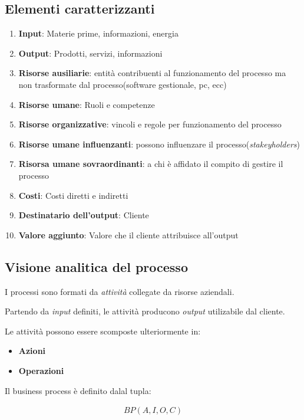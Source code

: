 \subsection{Elementi caratterizzanti}

\begin{enumerate}
  \item \textbf{Input}: Materie prime, informazioni, energia
  \item \textbf{Output}: Prodotti, servizi, informazioni
  \item \textbf{Risorse ausiliarie}: entità contribuenti al funzionamento del processo ma non trasformate dal processo(software gestionale, pc, ecc)
  \item \textbf{Risorse umane}: Ruoli e competenze
  \item \textbf{Risorse organizzative}: vincoli e regole per funzionamento del processo
  \item \textbf{Risorse umane influenzanti}: possono influenzare il processo(\textit{stakeyholders})
  \item \textbf{Risorsa umane sovraordinanti}: a chi è affidato il compito di gestire il processo
  \item \textbf{Costi}: Costi diretti e indiretti
  \item \textbf{Destinatario dell'output}: Cliente
  \item \textbf{Valore aggiunto}: Valore che il cliente attribuisce all'output
\end{enumerate}





\subsection{Visione analitica del processo}

I processi sono formati da \textit{attività} collegate da risorse aziendali.

Partendo da \textit{input} definiti, le attività producono \textit{output}
utilizabile dal cliente.


Le attività possono essere scomposte ulteriormente in:
\begin{itemize}
  \item \textbf{Azioni}
  \item \textbf{Operazioni}
\end{itemize}

Il business process è definito dalal tupla:

\begin{align}
  BP(A, I, O, C)
\end{align}

